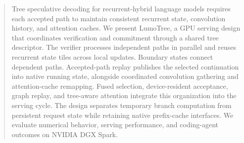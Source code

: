 \begin{abstract}
Tree speculative decoding for recurrent-hybrid language models requires each accepted path to maintain consistent recurrent state, convolution history, and attention caches. We present LumoTree, a GPU serving design that coordinates verification and commitment through a shared tree descriptor. The verifier processes independent paths in parallel and reuses recurrent state tiles across local updates. Boundary states connect dependent paths. Accepted-path replay publishes the selected continuation into native running state, alongside coordinated convolution gathering and attention-cache remapping. Fused selection, device-resident acceptance, graph replay, and tree-aware attention integrate this organization into the serving cycle. The design separates temporary branch computation from persistent request state while retaining native prefix-cache interfaces. We evaluate numerical behavior, serving performance, and coding-agent outcomes on NVIDIA DGX Spark.
\end{abstract}
